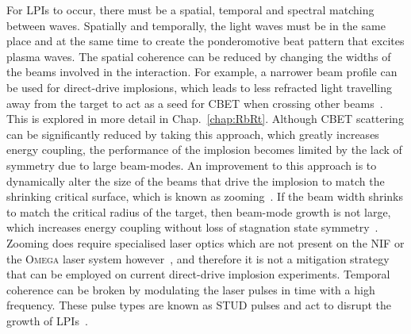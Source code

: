For \ac{LPIs} to occur, there must be a spatial, temporal and spectral matching between waves.
Spatially and temporally, the light waves must be in the same place and at the same time to create the ponderomotive beat pattern that excites plasma waves.
The spatial coherence can be reduced by changing the widths of the beams involved in the interaction.
For example, a narrower beam profile can be used for direct-drive implosions, which leads to less refracted light travelling away from the target to act as a seed for \ac{CBET} when crossing other beams~\cite{froula_increasing_2012}.
This is explored in more detail in Chap.~\ref{chap:RbRt}.
Although \ac{CBET} scattering can be significantly reduced by taking this approach, which greatly increases energy coupling, the performance of the implosion becomes limited by the lack of symmetry due to large beam-modes.
An improvement to this approach is to dynamically alter the size of the beams that drive the implosion to match the shrinking critical surface, which is known as zooming~\cite{froula_mitigation_2013}.
If the beam width shrinks to match the critical radius of the target, then beam-mode growth is not large, which increases energy coupling without loss of stagnation state symmetry~\cite{igumenshchev_laserbeam_2013}.
Zooming does require specialised laser optics which are not present on the \ac{NIF} or the \textsc{Omega} laser system however~\cite{kehne_implementation_2013}, and therefore it is not a mitigation strategy that can be employed on current direct-drive implosion experiments.
Temporal coherence can be broken by modulating the laser pulses in time with a high frequency.
These pulse types are known as STUD pulses and act to disrupt the growth of \ac{LPIs}~\cite{afeyan_optimal_2013}.

